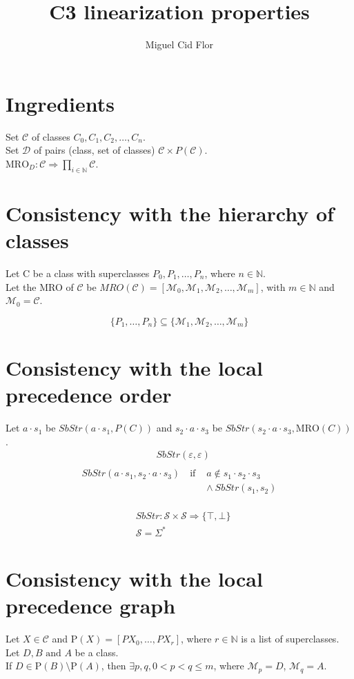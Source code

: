 \documentclass{article}
\author{Miguel Cid Flor}
\title{C3 linearization properties}
\begin{document}
\maketitle
\section*{Ingredients}

Set $\mathcal{C}$ of classes $C_0, C_1, C_2, \ldots, C_n$.\\
Set $\mathcal{D}$ of pairs (class, set of classes) $\mathcal{C} \times P(\mathcal{C})$.\\
$\text{MRO}_D : \mathcal{C} \Rightarrow \prod_{i \in \mathbb{N}} \mathcal{C}$.


\section*{Consistency with the hierarchy of classes} 

Let {C} be a class with superclasses $P_0, P_1, \dots, P_n$, where $n \in \mathbb{N}$. \\
Let the MRO of $\mathcal{C}$ be $MRO(\mathcal{C}) = [\mathcal{M}_0, \mathcal{M}_1, \mathcal{M}_2, \dots, \mathcal{M}_m]$, with $m \in \mathbb{N}$ and $\mathcal{M}_0 = \mathcal{C}$.

\[
\{P_1, \dots, P_n\} \subseteq \{\mathcal{M}_1, \mathcal{M}_2, \dots, \mathcal{M}_m\}
\]

\section*{Consistency with the local precedence order}
Let $a \cdot s_1$ be $SbStr(a \cdot s_1, P(C))$ and $s_2 \cdot a \cdot s_3$ be $SbStr(s_2 \cdot a \cdot s_3, \text{MRO}(C))$.\\

\begin{align*}
& SbStr(\varepsilon, \varepsilon) \\
\end{align*}
\begin{align*}
    SbStr(a \cdot s_1, s_2 \cdot a \cdot s_3) \quad \text{if } &
    a \notin s_1 \cdot s_2 \cdot s_3 \\
    & \land \ SbStr(s_1, s_2) \\
    \end{align*}
    
\begin{align*}
& SbStr : \mathcal{S} \times \mathcal{S} \Rightarrow \{\top, \bot\} \\
& \mathcal{S} = \Sigma^*
\end{align*}

\section*{Consistency with the local precedence graph}

Let $X\in\mathcal{C}$ and $\text{P}(X) = [PX_0, \dots, PX_r]$, where $r \in \mathbb{N}$ is a list of superclasses. \\
Let $D, B \text{ and } A$ be a class. \\
If $D \in \text{P}(B) \setminus \text{P}(A)$, then $\exists p,q ,0 < p < q \leq m$, where $\mathcal{M}_p = D$, $\mathcal{M}_q = A$.
\end{document}
